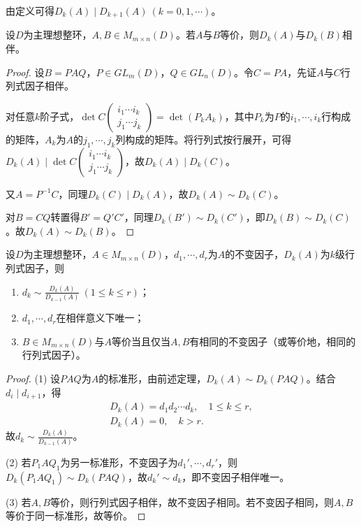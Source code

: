 \documentclass[../../main.tex]{subfiles}%
\begin{document}
\begin{remark}
由定义可得$D_k(A)\mid D_{k+1}(A)\ (k=0,1,\cdots)$。
\end{remark}

\begin{theorem}
设$D$为主理想整环，$A,B\in M_{m\times n}(D)$。若$A$与$B$等价，则$D_k(A)$与$D_k(B)$相伴。
\end{theorem}

\begin{proof}
设$B=PAQ$，$P\in GL_m(D)$，$Q\in GL_n(D)$。令$C=PA$，先证$A$与$C$行列式因子相伴。

对任意$k$阶子式，$\det C\begin{pmatrix}i_1\cdots i_k\\j_1\cdots j_k\end{pmatrix}=\det(P_kA_k)$，其中$P_k$为$P$的$i_1,\cdots,i_k$行构成的矩阵，$A_k$为$A$的$j_1,\cdots,j_k$列构成的矩阵。将行列式按行展开，可得$D_k(A)\mid\det C\begin{pmatrix}i_1\cdots i_k\\j_1\cdots j_k\end{pmatrix}$，故$D_k(A)\mid D_k(C)$。

又$A=P^{-1}C$，同理$D_k(C)\mid D_k(A)$，故$D_k(A)\sim D_k(C)$。

对$B=CQ$转置得$B'=Q'C'$，同理$D_k(B')\sim D_k(C')$，即$D_k(B)\sim D_k(C)$。故$D_k(A)\sim D_k(B)$。
\end{proof}

\begin{theorem}
设$D$为主理想整环，$A\in M_{m\times n}(D)$，$d_1,\cdots,d_r$为$A$的不变因子，$D_k(A)$为$k$级行列式因子，则
\begin{enumerate}[(1)]
\item $d_k\sim\frac{D_k(A)}{D_{k-1}(A)}\ (1\leqslant k\leqslant r)$；
\item $d_1,\cdots,d_r$在相伴意义下唯一；
\item $B\in M_{m\times n}(D)$与$A$等价当且仅当$A,B$有相同的不变因子（或等价地，相同的行列式因子）。
\end{enumerate}
\end{theorem}

\begin{proof}
(1) 设$PAQ$为$A$的标准形，由前述定理，$D_k(A)\sim D_k(PAQ)$。结合$d_i\mid d_{i+1}$，得
\begin{align*}
D_k(A)=d_1d_2\cdots d_k,\quad 1\leqslant k\leqslant r,\\
D_k(A)=0,\quad k>r.
\end{align*}
故$d_k\sim\frac{D_k(A)}{D_{k-1}(A)}$。

(2) 若$P_1AQ_1$为另一标准形，不变因子为$d_1',\cdots,d_r'$，则$D_k(P_1AQ_1)\sim D_k(PAQ)$，故$d_k'\sim d_k$，即不变因子相伴唯一。

(3) 若$A,B$等价，则行列式因子相伴，故不变因子相同。若不变因子相同，则$A,B$等价于同一标准形，故等价。
\end{proof}
\end{document}
